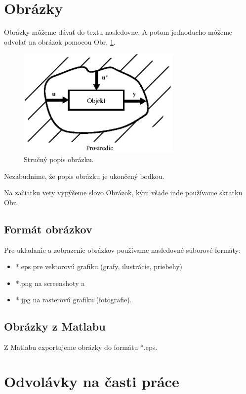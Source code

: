 \section{Obrázky}

Obrázky môžeme dávať do textu nasledovne. A potom jednoducho môžeme odvolať na obrázok pomocou Obr. \ref{OBRAZOK 1.1}.
\begin{figure}[!tbh]
\centering
\includegraphics[width=80mm]{obr/OBRAZOK1_1.eps}
\caption{Stručný popis obrázku.}\label{OBRAZOK 1.1}
\end{figure}
Nezabudnime, že popis obrázku je ukončený bodkou.

Na začiatku vety vypýšeme slovo Obrázok, kým všade inde používame skratku Obr.

\subsection{Formát obrázkov}

Pre ukladanie a zobrazenie obrázkov používame nasledovné súborové formáty:
\begin{itemize}
\item *.eps pre vektorovú grafiku (grafy, ilustrácie, priebehy)
\item *.png na screenshoty a
\item *.jpg na rasterovú grafiku (fotografie).
\end{itemize}

\subsection{Obrázky z Matlabu}

Z Matlabu exportujeme obrázky do formátu *.eps.

\section{Odvolávky na časti práce}
\label{hrusky}

